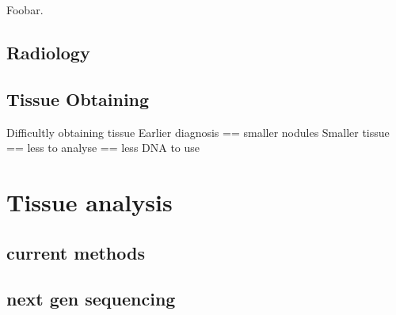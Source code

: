 Foobar\supercite{Schiller:2002gi}.

\subsection{Radiology}
\subsection{Tissue Obtaining}
Difficultly obtaining tissue
Earlier diagnosis == smaller nodules 
Smaller tissue == less to analyse == less DNA to use

\section{Tissue analysis}
\subsection{current methods}
\subsection{next gen sequencing}